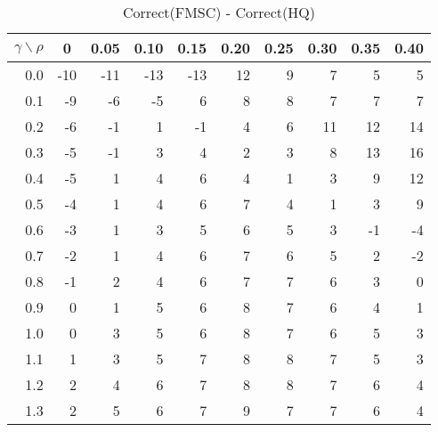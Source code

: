 \documentclass[12pt]{article}
\begin{document}
%
\begin{table}[!tbp]
\caption{Correct(FMSC) - Correct(HQ)}
 \begin{center}
 \begin{tabular}{r|rrrrrrrrr}\hline\hline
\multicolumn{1}{c|}{$\gamma\backslash\rho$}&\multicolumn{1}{c}{0}&\multicolumn{1}{c}{0.05}&\multicolumn{1}{c}{0.10}&\multicolumn{1}{c}{0.15}&\multicolumn{1}{c}{0.20}&\multicolumn{1}{c}{0.25}&\multicolumn{1}{c}{0.30}&\multicolumn{1}{c}{0.35}&\multicolumn{1}{c}{0.40}\tabularnewline
\hline



0.0&-10&-11&-13&-13&12&9& 7& 5& 5\tabularnewline
0.1& -9& -6& -5&  6& 8&8& 7& 7& 7\tabularnewline
0.2& -6& -1&  1& -1& 4&6&11&12&14\tabularnewline
0.3& -5& -1&  3&  4& 2&3& 8&13&16\tabularnewline
0.4& -5&  1&  4&  6& 4&1& 3& 9&12\tabularnewline
0.5& -4&  1&  4&  6& 7&4& 1& 3& 9\tabularnewline
0.6& -3&  1&  3&  5& 6&5& 3&-1&-4\tabularnewline
0.7& -2&  1&  4&  6& 7&6& 5& 2&-2\tabularnewline
0.8& -1&  2&  4&  6& 7&7& 6& 3& 0\tabularnewline
0.9&  0&  1&  5&  6& 8&7& 6& 4& 1\tabularnewline
1.0&  0&  3&  5&  6& 8&7& 6& 5& 3\tabularnewline
1.1&  1&  3&  5&  7& 8&8& 7& 5& 3\tabularnewline
1.2&  2&  4&  6&  7& 8&8& 7& 6& 4\tabularnewline
1.3&  2&  5&  6&  7& 9&7& 7& 6& 4\tabularnewline
\hline
\end{tabular}

\end{center}

\end{table}
\end{document}
